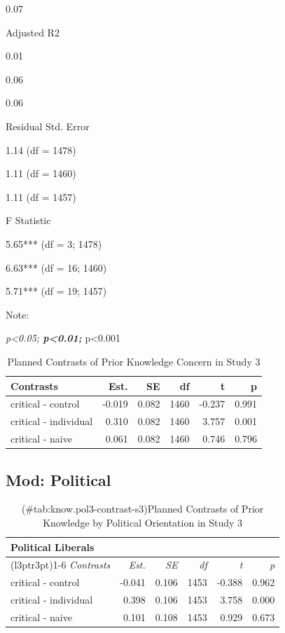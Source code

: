 \documentclass[
]{book}
\begin{document}
0.07

Adjusted R2

0.01

0.06

0.06

Residual Std. Error

1.14 (df = 1478)

1.11 (df = 1460)

1.11 (df = 1457)

F Statistic

5.65*** (df = 3; 1478)

6.63*** (df = 16; 1460)

5.71*** (df = 19; 1457)

Note:

\emph{p\textless0.05; \textbf{p\textless0.01; }}p\textless0.001

\begin{table}

\caption{\label{tab:know-contrast-s3}Planned Contrasts of Prior Knowledge Concern in Study 3}
\centering
\fontsize{13}{15}\selectfont
\begin{tabular}[t]{lrrrrr}
\toprule
Contrasts & Est. & SE & df & t & p\\
\midrule
critical - control & -0.019 & 0.082 & 1460 & -0.237 & 0.991\\
critical - individual & 0.310 & 0.082 & 1460 & 3.757 & 0.001\\
critical - naive & 0.061 & 0.082 & 1460 & 0.746 & 0.796\\
\bottomrule
\end{tabular}
\end{table}

\hypertarget{mod-political-21}{%
\subsection{Mod: Political}\label{mod-political-21}}

\begin{table}

\caption{(\#tab:know.pol3-contrast-s3)Planned Contrasts of Prior Knowledge by Political Orientation in Study 3}
\centering
\fontsize{13}{15}\selectfont
\begin{tabular}[t]{lrrrrr}
\toprule
\multicolumn{6}{l}{Political Liberals} \\
\cmidrule(l{3pt}r{3pt}){1-6}
\em{Contrasts} & \em{Est.} & \em{SE} & \em{df} & \em{t} & \em{p}\\
\midrule
critical - control & -0.041 & 0.106 & 1453 & -0.388 & 0.962\\
critical - individual & 0.398 & 0.106 & 1453 & 3.758 & 0.000\\
critical - naive & 0.101 & 0.108 & 1453 & 0.929 & 0.673\\
\bottomrule
\end{tabular}
\end{table}
\end{document}
